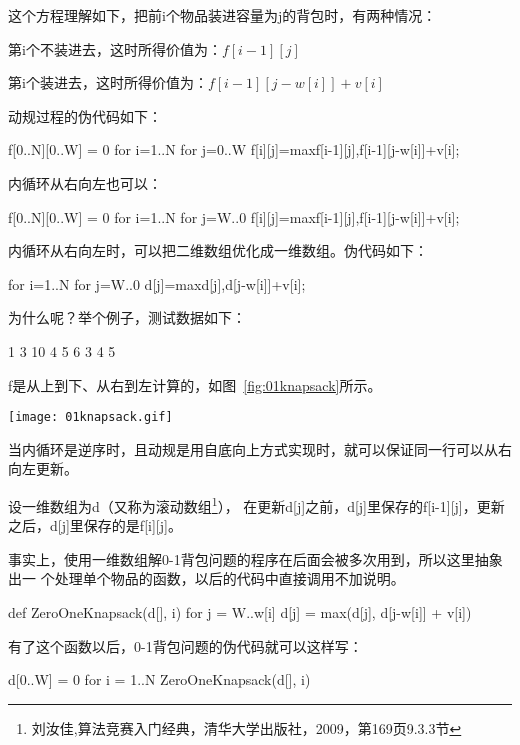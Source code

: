 这个方程理解如下，把前i个物品装进容量为j的背包时，有两种情况：
\begindot
\item 第i个不装进去，这时所得价值为：$f[i-1][j]$
\item 第i个装进去，这时所得价值为：$f[i-1][j-w[i]]+v[i]$
\myenddot

动规过程的伪代码如下：
\begin{Code}
f[0..N][0..W] = 0
for i=1..N
    for j=0..W
        f[i][j]=max{f[i-1][j],f[i-1][j-w[i]]+v[i]};
\end{Code}

内循环从右向左也可以：
\begin{Code}
f[0..N][0..W] = 0
for i=1..N
    for j=W..0
        f[i][j]=max{f[i-1][j],f[i-1][j-w[i]]+v[i]};
\end{Code}

内循环从右向左时，可以把二维数组优化成一维数组。伪代码如下：
\begin{Code}
for i=1..N
    for j=W..0
        d[j]=max{d[j],d[j-w[i]]+v[i]};
\end{Code}

为什么呢？举个例子，测试数据如下：
\begin{Code}
1
3 10
4 5 6
3 4 5
\end{Code}

f是从上到下、从右到左计算的，如图~\ref{fig:01knapsack}所示。
\begin{center}
\texttt{[image: 01knapsack.gif]}\\
\label{fig:01knapsack}
\end{center}

当内循环是逆序时，且动规是用自底向上方式实现时，就可以保证同一行可以从右向左更新。

设一维数组为d（又称为滚动数组\footnote{刘汝佳,算法竞赛入门经典，清华大学出版社，2009，第169页9.3.3节}），
在更新d[j]之前，d[j]里保存的f[i-1][j]，更新之后，d[j]里保存的是f[i][j]。

事实上，使用一维数组解0-1背包问题的程序在后面会被多次用到，所以这里抽象出一
个处理单个物品的函数，以后的代码中直接调用不加说明。
\begin{Code}
def ZeroOneKnapsack(d[], i)
    for j = W..w[i]
        d[j] = max(d[j], d[j-w[i]] + v[i])
\end{Code}

有了这个函数以后，0-1背包问题的伪代码就可以这样写：
\begin{Code}
d[0..W] = 0
for i = 1..N
    ZeroOneKnapsack(d[], i)
\end{Code}

